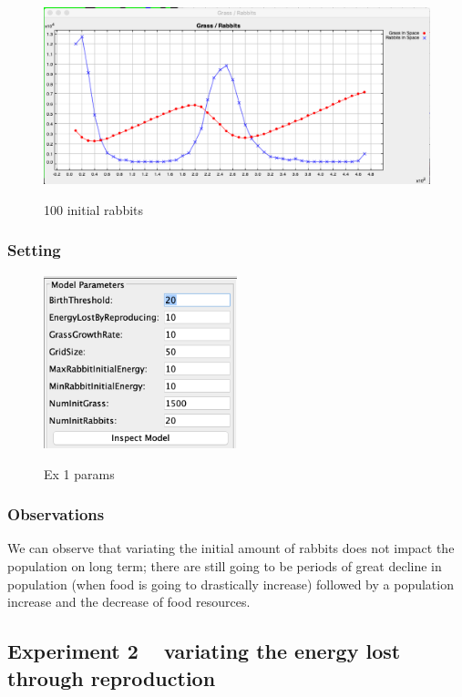 \documentclass[11pt]{article}
\begin{document}
\begin{figure}[H]
\includegraphics[width=1.0\textwidth]{ex1-chart-100}
\centering
\label{fig:ex1-100}
\caption{ 100 initial rabbits }
\end{figure}


\subsubsection{Setting}
\begin{figure}[H]
\includegraphics[width=0.5\textwidth]{ex1-params}
\centering
\label{fig:movement-directions}
\caption{ Ex 1 params }
\end{figure}


\subsubsection{Observations}
We can observe that variating the initial amount of rabbits does not impact the population on long term; there are still going to be periods of great decline in population (when food is going to drastically increase) followed by a population increase and the decrease of food resources.

\subsection{Experiment 2 ~ variating the energy lost through reproduction}
\end{document}

